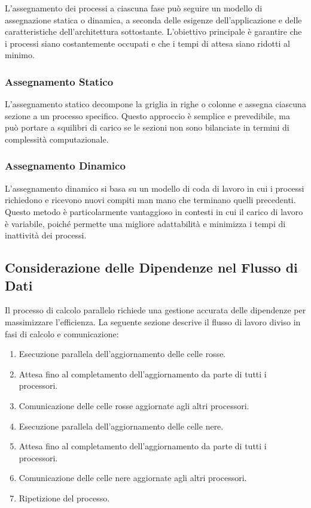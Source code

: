 L'assegnamento dei processi a ciascuna fase può seguire un modello
di assegnazione statica o dinamica, a seconda delle esigenze dell'applicazione
e delle caratteristiche dell'architettura sottostante. L'obiettivo principale
è garantire che i processi siano costantemente occupati e che i tempi di attesa
siano ridotti al minimo.

\subsubsection{Assegnamento Statico}
L'assegnamento statico decompone la griglia in righe o colonne e assegna
ciascuna sezione a un processo specifico. Questo approccio è semplice e prevedibile,
ma può portare a squilibri di carico se le sezioni non sono bilanciate in termini
di complessità computazionale.

\subsubsection{Assegnamento Dinamico}
L'assegnamento dinamico si basa su un modello di coda di lavoro in cui i processi
richiedono e ricevono nuovi compiti man mano che terminano quelli precedenti.
Questo metodo è particolarmente vantaggioso in contesti in cui il carico di
lavoro è variabile, poiché permette una migliore adattabilità e minimizza i
tempi di inattività dei processi.


\subsection{Considerazione delle Dipendenze nel Flusso di Dati}

Il processo di calcolo parallelo richiede una gestione accurata delle dipendenze
per massimizzare l'efficienza. La seguente sezione descrive il flusso di lavoro
diviso in fasi di calcolo e comunicazione:

\begin{enumerate}
    \item Esecuzione parallela dell'aggiornamento delle celle rosse.
    \item Attesa fino al completamento dell'aggiornamento da parte di tutti
    i processori.
    \item Comunicazione delle celle rosse aggiornate agli altri processori.
    \item Esecuzione parallela dell'aggiornamento delle celle nere.
    \item Attesa fino al completamento dell'aggiornamento da parte di tutti
    i processori.
    \item Comunicazione delle celle nere aggiornate agli altri processori.
    \item Ripetizione del processo.
\end{enumerate}

